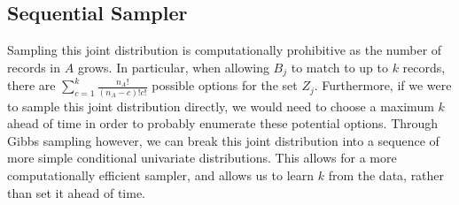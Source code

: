 \documentclass[12pt,letterpaper]{article}
\newcommand{\1}[1]{\mathbb{I}\!\left[#1\right]} %
\def \brian#1{{\color{red} (#1)}}
\begin{document}

%
%

\subsection{Sequential Sampler}\label{sec:sequential-sampler}

Sampling this joint distribution is computationally prohibitive as the number of records in $A$ grows. In particular, when allowing $B_j$ to match to up to $k$ records, there are $\sum_{c = 1}^k \frac{n_A!}{(n_A - c)!c!}$ possible options for the set $Z_j$. Furthermore, if we were to sample this joint distribution directly, we would need to choose a maximum $k$ ahead of time in order to probably enumerate these potential options. Through Gibbs sampling however, we can break this joint distribution into a sequence of more simple conditional univariate distributions. This allows for a more computationally efficient sampler, and allows us to learn $k$ from the data, rather than set it ahead of time. 
\end{document}
